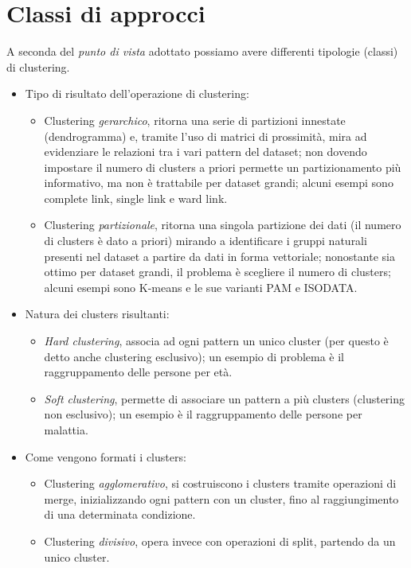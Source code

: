 \documentclass[a4paper,oneside,titlepage]{book}
\begin{document}
\section{Classi di approcci}
A seconda del \textit{punto di vista} adottato possiamo avere differenti tipologie (classi) di clustering.
\begin{itemize}
    \item Tipo di risultato dell'operazione di clustering:
    \begin{itemize}
        \item Clustering \textit{gerarchico}, ritorna una serie di partizioni innestate (dendrogramma) e, tramite l'uso di matrici di prossimità, mira ad evidenziare le relazioni tra i vari pattern del dataset; non dovendo impostare il numero di clusters a priori permette un partizionamento più informativo, ma non è trattabile per dataset grandi; alcuni esempi sono complete link, single link e ward link.
        \item Clustering \textit{partizionale}, ritorna una singola partizione dei dati (il numero di clusters è dato a priori) mirando a identificare i gruppi naturali presenti nel dataset a partire da dati in forma vettoriale; nonostante sia ottimo per dataset grandi, il problema è scegliere il numero di clusters; alcuni esempi sono K-means e le sue varianti PAM e ISODATA.
    \end{itemize}
    \item Natura dei clusters risultanti:
    \begin{itemize}
        \item \textit{Hard clustering}, associa ad ogni pattern un unico cluster (per questo è detto anche clustering esclusivo); un esempio di problema è il raggruppamento delle persone per età.
        \item \textit{Soft clustering}, permette di associare un pattern a più clusters (clustering non esclusivo); un esempio è il raggruppamento delle persone per malattia.
    \end{itemize}
    \item Come vengono formati i clusters:
    \begin{itemize}
        \item Clustering \textit{agglomerativo}, si costruiscono i clusters tramite operazioni di merge, inizializzando ogni pattern con un cluster, fino al raggiungimento di una determinata condizione.
        \item Clustering \textit{divisivo}, opera invece con operazioni di split, partendo da un unico cluster.

\end{itemize}
\end{itemize}
\end{document}
